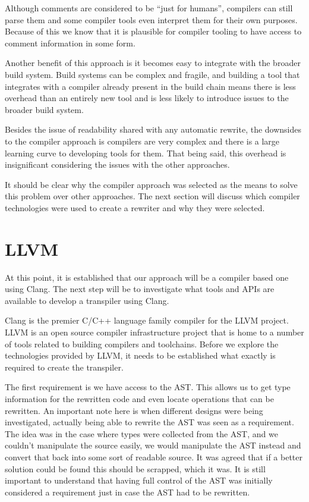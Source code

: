 Although comments are considered to be ``just for humans'', compilers can still parse them and some compiler tools even interpret them for their own purposes. Because of this we know that it is plausible for compiler tooling to have access to comment information in some form.

Another benefit of this approach is it becomes easy to integrate with the broader build system. Build systems can be complex and fragile, and building a tool that integrates with a compiler already present in the build chain means there is less overhead than an entirely new tool and is less likely to introduce issues to the broader build system.

Besides the issue of readability shared with any automatic rewrite, the downsides to the compiler approach is compilers are very complex and there is a large learning curve to developing tools for them. That being said, this overhead is insignificant considering the issues with the other approaches.

It should be clear why the compiler approach was selected as the means to solve this problem over other approaches. The next section will discuss which compiler technologies were used to create a rewriter and why they were selected.

\section{LLVM}

At this point, it is established that our approach will be a compiler based one using Clang. The next step will be to investigate what tools and APIs are available to develop a transpiler using Clang.

Clang is the premier C/C++ language family compiler for the LLVM project. LLVM is an open source compiler infrastructure project that is home to a number of tools related to building compilers and toolchains. Before we explore the technologies provided by LLVM, it needs to be established what exactly is required to create the transpiler.

The first requirement is we have access to the AST. This allows us to get type information for the rewritten code and even locate operations that can be rewritten. An important note here is when different designs were being investigated, actually being able to rewrite the AST was seen as a requirement. The idea was in the case where types were collected from the AST, and we couldn't manipulate the source easily, we would manipulate the AST instead and convert that back into some sort of readable source. It was agreed that if a better solution could be found this should be scrapped, which it was. It is still important to understand that having full control of the AST was initially considered a requirement just in case the AST had to be rewritten.

